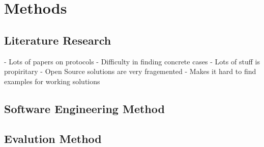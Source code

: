 \chapter{\label{methods}Methods}
\thispagestyle{fancy}

\section{Literature Research}

- Lots of papers on protocols
- Difficulty in finding concrete cases
- Lots of stuff is propiritary
  - Open Source solutions are very fragemented
  - Makes it hard to find examples for working solutions

\section{Software Engineering Method}

\section{Evalution Method}

